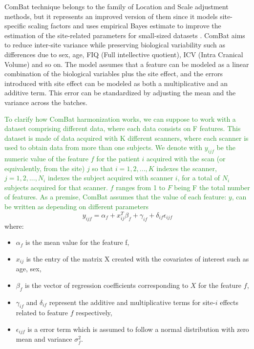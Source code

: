 \documentclass[11pt]{report}
\begin{document}
ComBat technique belongs to the family of Location and Scale adjustment methods, but it represents an improved version of them since it models site-specific scaling factors and uses empirical Bayes estimate to improve the estimation of the site-related parameters for small-sized datasets \cite{fortin-2018}.
ComBat aims to reduce inter-site variance while preserving biological variability such as differences due to sex, age, FIQ (Full intellective quotient), ICV (Intra Cranical Volume) and so on.
The model assumes that a feature can be modeled as a linear combination of the biological variables plus the site effect, and the errors introduced with site effect can be modeled as both a multiplicative and an additive term. This error can be standardized by adjusting the mean and the variance across the batches.

\textcolor{ForestGreen}{
To clarify how ComBat harmonization works, we can suppose to work with a dataset comprising different data, where each data consists on F features.
This dataset is made of data acquired with K different scanners, where each scanner is used to obtain data from more than one subjects.
We denote with $y_{ijf}$ be the numeric value of the feature $f$ for the patient $i$ acquired with the scan (or equivalently, from the site) $j$
so that $i = 1, 2, ..., K$ indexes the scanner, $j = 1, 2, ..., N_i$ indexes the subject acquired with scanner $i$, for a total of $N_i$ subjects acquired for that scanner. $f$ ranges from 1 to $F$ being F the total number of features.
As a premise, ComBat assumes that the value of each feature: $y$, can be written as depending on different parameters
}
\begin{equation}
y_{ijf} = \alpha_f + x_{ij}^T \beta _f + \gamma_{if} + \delta_{if} \epsilon_{ijf}
\end{equation}
where:
\begin{itemize}
\item $\alpha_f$ is the mean value for the feature f,
\item $x_{ij}$ is the entry of the matrix X created with the covariates of interest such as age, sex,
\item $\beta_f$ is the vector of regression coefficients corresponding to $X$ for the feature $f$,
\item $\gamma_{if}$ and $\delta_{if}$ represent the additive and multiplicative terms for site-$i$ effects related to feature $f$ respectively,
\item $\epsilon_{ijf}$ is a error term which is assumed to follow a normal distribution with zero mean and variance $\sigma_f^2$.
\end{itemize}
\end{document}
